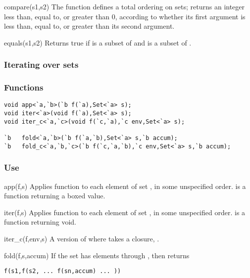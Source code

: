 \begin{defun}{compare}{(s1,s2)}
The function  defines a total ordering on sets;
 returns an integer less than, equal
to, or greater than 0, according to whether its first argument is less
than, equal to, or greater than its second argument.
\end{defun}

\begin{defun}{equals}{(s1,s2)}
Returns true if  is a subset of  and  is a
subset of .
\end{defun}

\subsubsection*{Iterating over sets}
\subsubsection*{Functions}
\begin{verbatim}
void app<`a,`b>(`b f(`a),Set<`a> s);
void iter<`a>(void f(`a),Set<`a> s);
void iter_c<`a,`c>(void f(`c,`a),`c env,Set<`a> s);

`b   fold<`a,`b>(`b f(`a,`b),Set<`a> s,`b accum);
`b   fold_c<`a,`b,`c>(`b f(`c,`a,`b),`c env,Set<`a> s,`b accum);
\end{verbatim}

\subsubsection*{Use}

\begin{defun}{app}{(f,s)}
Applies function  to each element of set , in some
unspecified order.   is a function returning a boxed value.
\end{defun}

\begin{defun}{iter}{(f,s)}
Applies function  to each element of set , in some
unspecified order.   is a function returning void.
\end{defun}

\begin{defun}{iter_c}{(f,env,s)}
A version of  where  takes a closure, .
\end{defun}

\begin{defun}{fold}{(f,s,accum)}
If the set  has elements  through , then
 returns
\begin{verbatim}
f(s1,f(s2, ... f(sn,accum) ... ))
\end{verbatim}
\end{defun}

